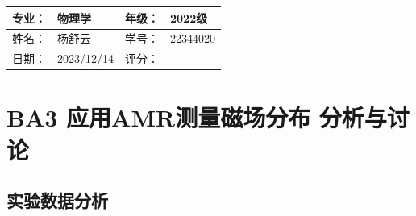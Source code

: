 \documentclass[dvipsnames, svgnames,a4paper,11pt]{article}
\begin{document}
	
	
	\clearpage
	\begin{table}
		\renewcommand\arraystretch{1.7}
		\begin{tabularx}{\textwidth}{|X|X|X|X|}
			\hline
			专业：& 物理学 &年级：& 2022级\\
			\hline
			姓名： & 杨舒云 & 学号：& 22344020\\
			\hline
			日期：& 2023/12/14 & 评分： &\\
			\hline
		\end{tabularx}
	\end{table}
	
	\section{BA3 应用AMR测量磁场分布 \quad\heiti 分析与讨论}
	\subsection{实验数据分析}
\end{document}
